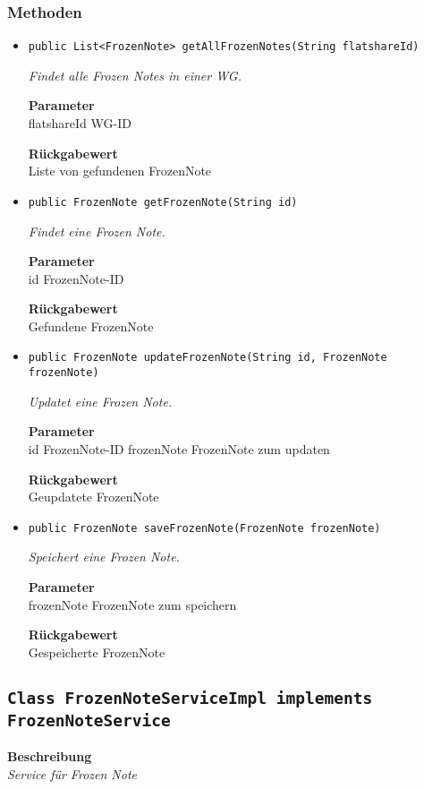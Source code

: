     \subsubsection*{Methoden}
    \begin{itemize}
    	\item{\texttt{public List<FrozenNote> getAllFrozenNotes(String flatshareId)}}
    	
    	\textit{Findet alle Frozen Notes in einer WG.}
    	
    	\textbf{Parameter} \\
    	flatshareId WG-ID
    	
    	\textbf{Rückgabewert} \\
    	Liste von gefundenen FrozenNote        \item{\texttt{public FrozenNote getFrozenNote(String id)}}
    	
    	\textit{Findet eine Frozen Note.}
    	
    	\textbf{Parameter} \\
    	id FrozenNote-ID
    	
    	\textbf{Rückgabewert} \\
    	Gefundene FrozenNote        \item{\texttt{public FrozenNote updateFrozenNote(String id, FrozenNote frozenNote)}}
    	
    	\textit{Updatet eine Frozen Note.}
    	
    	\textbf{Parameter} \\
    	id FrozenNote-ID
    	frozenNote FrozenNote zum updaten
    	
    	\textbf{Rückgabewert} \\
    	Geupdatete FrozenNote        \item{\texttt{public FrozenNote saveFrozenNote(FrozenNote frozenNote)}}
    	
    	\textit{Speichert eine Frozen Note.}
    	
    	\textbf{Parameter} \\
    	frozenNote FrozenNote zum speichern
    	
    	\textbf{Rückgabewert} \\
    	Gespeicherte FrozenNote
    \end{itemize}
    \subsection{\texttt{Class FrozenNoteServiceImpl implements FrozenNoteService}}
    \textbf{Beschreibung} \\
    \textit{Service für Frozen Note}
